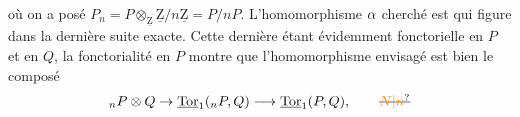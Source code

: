 où on a posé $P_n=P\otimes_{\underline{\mathrm Z}}\underline{\mathrm Z}/n\underline{\mathrm Z}=P/nP$. L'homomorphisme $\alpha$  cherché est   qui figure dans la dernière suite exacte. Cette dernière étant évidemment fonctorielle en $P$ et en $Q$, la fonctorialité en $P$ montre que l'homomorphisme envisagé est bien le composé
\[ \handwritten{{}_n}P\otimes Q\to\underline{\mathrm{Tor}}_1\handwritten{({}_nP,Q)\longrightarrow\underline{\mathrm{Tor}}_1(P,Q),}\qquad\deleted{\unsure{N|n}} \]
